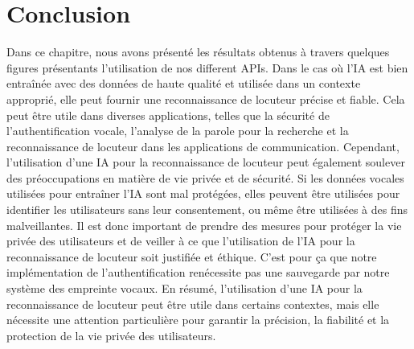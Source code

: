 \section*{Conclusion}
Dans ce chapitre, nous avons présenté les résultats obtenus à travers quelques figures présentants l’utilisation de nos different APIs.
Dans le cas où l'IA est bien entraînée avec des données de haute qualité et utilisée dans un contexte approprié, elle peut fournir une reconnaissance de locuteur précise et fiable. Cela peut être utile dans diverses applications, telles que la sécurité de l'authentification vocale, l'analyse de la parole pour la recherche et la reconnaissance de locuteur dans les applications de communication.
Cependant, l'utilisation d'une IA pour la reconnaissance de locuteur peut également soulever des préoccupations en matière de vie privée et de sécurité. Si les données vocales utilisées pour entraîner l'IA sont mal protégées, elles peuvent être utilisées pour identifier les utilisateurs sans leur consentement, ou même être utilisées à des fins malveillantes. Il est donc important de prendre des mesures pour protéger la vie privée des utilisateurs et de veiller à ce que l'utilisation de l'IA pour la reconnaissance de locuteur soit justifiée et éthique. C’est pour ça que notre implémentation de l’authentification renécessite pas une sauvegarde par notre système des empreinte vocaux. 
En résumé, l'utilisation d'une IA pour la reconnaissance de locuteur peut être utile dans certains contextes, mais elle nécessite une attention particulière pour garantir la précision, la fiabilité et la protection de la vie privée des utilisateurs.
